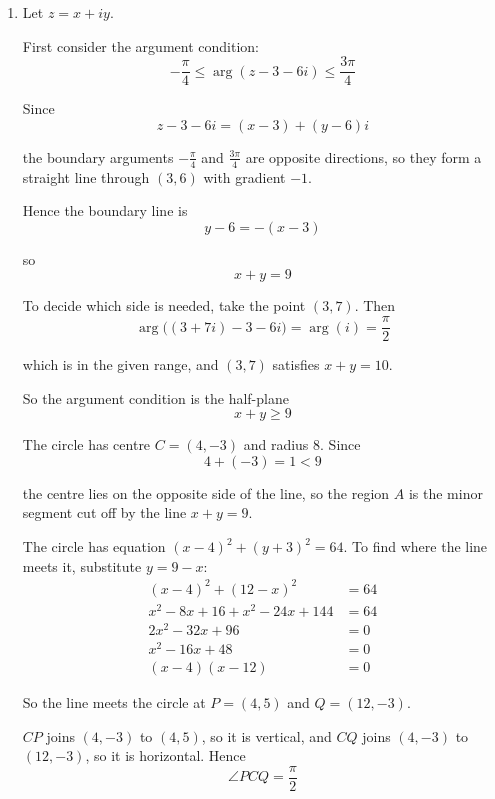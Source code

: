 \documentclass[leqno]{article}
\begin{document}
\begin{enumerate}[
  label=\textbf{\arabic*.},
  leftmargin=*,
  topsep=0pt,
  partopsep=0pt,
  parsep=0pt
]
\begin{djsSolution}
\begin{enumerate}[label=\textbf{(\alph*)}]
  The centre \(C\) of the circle represents \(4-3i\), so
  \[
  OC=|4-3i|=\sqrt{4^2+(-3)^2}=5
  \]

  The point of the region furthest from \(O\) is where the line from \(O\) through \(C\) meets the circle on the far side of \(C\). Its distance from \(O\) is \(OC\) plus the radius.

  Therefore the maximum value of \(|z|\) is
  \[
  5+8=13
  \]

  \item
  Let \(z=x+iy\).

  First consider the argument condition:
  \[
  -\frac{\pi}{4}\le \arg(z-3-6i)\le \frac{3\pi}{4}
  \]

  Since
  \[
  z-3-6i=(x-3)+(y-6)i
  \]

  the boundary arguments \(-\frac{\pi}{4}\) and \(\frac{3\pi}{4}\) are opposite directions, so they form a straight line through \((3,6)\) with gradient \(-1\).

  Hence the boundary line is
  \[
  y-6=-(x-3)
  \]

  so
  \[
  x+y=9
  \]

  To decide which side is needed, take the point \((3,7)\). Then
  \[
  \arg\bigl((3+7i)-3-6i\bigr)=\arg(i)=\frac{\pi}{2}
  \]

  which is in the given range, and \((3,7)\) satisfies \(x+y=10\).

  So the argument condition is the half-plane
  \[
  x+y\ge 9
  \]

  The circle has centre \(C=(4,-3)\) and radius \(8\). Since
  \[
  4+(-3)=1<9
  \]

  the centre lies on the opposite side of the line, so the region \(A\) is the minor segment cut off by the line \(x+y=9\).

  The circle has equation \((x-4)^2+(y+3)^2=64\). To find where the line meets it, substitute \(y=9-x\):
  \begin{align*}
  (x-4)^2+(12-x)^2&=64\\
  x^2-8x+16+x^2-24x+144&=64\\
  2x^2-32x+96&=0\\
  x^2-16x+48&=0\\
  (x-4)(x-12)&=0
  \end{align*}

  So the line meets the circle at \(P=(4,5)\) and \(Q=(12,-3)\).

  \(CP\) joins \((4,-3)\) to \((4,5)\), so it is vertical, and \(CQ\) joins \((4,-3)\) to \((12,-3)\), so it is horizontal. Hence
  \[
  \angle PCQ=\frac{\pi}{2}
  \]


\end{enumerate}
\end{djsSolution}
\end{enumerate}
\end{document}
